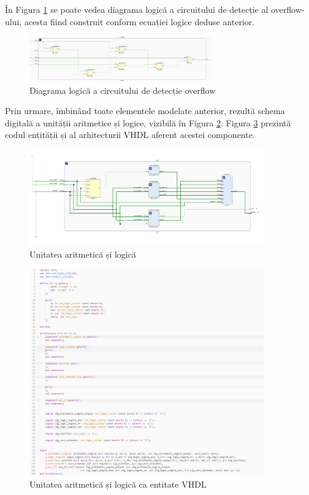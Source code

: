 \documentclass[12pt]{article}
\begin{document}
În Figura \ref{Figura:28} se poate vedea diagrama logică a circuitului de detecție al overflow-ului, acesta fiind construit conform ecuației logice deduse anterior.

 \begin{figure}[h!]
 \includegraphics[width=0.7\textwidth]{overflow.png}
 \centering
 \caption{Diagrama logică a circuitului de detecție overflow}
 \label{Figura:28}
 \end{figure}
 
\newpage

Prin urmare, îmbinând toate elementele modelate anterior, rezultă schema digitală a unității aritmetice și logice, vizibilă în Figura \ref{Figura:21}. Figura \ref{Figura:29} prezintă codul entității și al arhitecturii VHDL aferent acestei componente.
\begin{figure}[h!]
 \includegraphics[width=0.9\textwidth]{ALU.png}
 \centering
 \caption{Unitatea aritmetică și logică}
 \label{Figura:21}
 \end{figure}


\begin{figure}[h!]
 \includegraphics[width=0.9\textwidth]{aluVHDL.png}
 \centering
 \caption{Unitatea aritmetică și logică ca entitate VHDL}
 \label{Figura:29}
 \end{figure}
 
\end{document}
